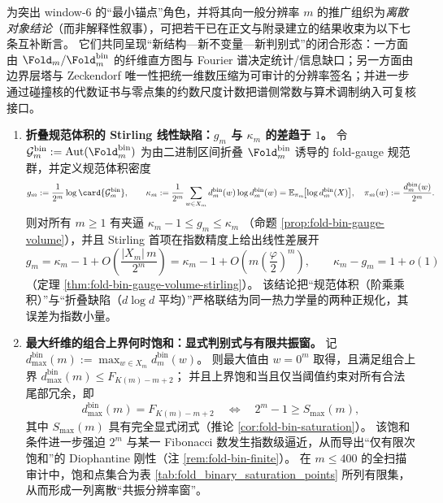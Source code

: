 为突出 window-\(6\) 的“最小锚点”角色，并将其向一般分辨率 \(m\) 的推广组织为\emph{离散对象结论}（而非解释性叙事），可把若干已在正文与附录建立的结果收束为以下七条互补断言。
它们共同呈现“新结构—新不变量—新判别式”的闭合形态：一方面由 \(\Fold_m/\Fold^{\mathrm{bin}}_m\) 的纤维直方图与 Fourier 谱决定统计/信息缺口；另一方面由边界层塔与 Zeckendorf 唯一性把统一维数压缩为可审计的分辨率签名；并进一步通过碰撞核的代数证书与零点集的约数尺度计数把谱侧常数与算术调制纳入可复核接口。

\begin{enumerate}
  \item \textbf{折叠规范体积的 Stirling 线性缺陷：\texorpdfstring{$g_m$}{gm} 与 \texorpdfstring{$\kappa_m$}{kappa} 的差趋于 \(1\)。}
  令
  \(\mathcal{G}^{\mathrm{bin}}_m:=\mathrm{Aut}(\Fold^{\mathrm{bin}}_m)\)
  为由二进制区间折叠 \(\Fold^{\mathrm{bin}}_m\) 诱导的 fold-gauge 规范群，并定义规范体积密度
  \[
  g_m:=\frac{1}{2^m}\log\card{\mathcal{G}^{\mathrm{bin}}_m},
  \qquad
  \kappa_m
  :=\frac{1}{2^m}\sum_{w\in X_m}d^{\mathrm{bin}}_m(w)\log d^{\mathrm{bin}}_m(w)
  =\mathbb{E}_{\pi_m}\!\bigl[\log d^{\mathrm{bin}}_m(X)\bigr],
  \quad
  \pi_m(w):=\frac{d^{\mathrm{bin}}_m(w)}{2^m}.
  \]
  则对所有 \(m\ge 1\) 有夹逼
  \(
  \kappa_m-1\le g_m\le \kappa_m
  \)
  （命题 \ref{prop:fold-bin-gauge-volume}），并且 Stirling 首项在指数精度上给出线性差展开
  \[
  g_m=\kappa_m-1+O\!\left(\frac{|X_m|\,m}{2^m}\right)
  =\kappa_m-1+O\!\left(m\left(\frac{\varphi}{2}\right)^m\right),
  \qquad
  \kappa_m-g_m=1+o(1)
  \]
  （定理 \ref{thm:fold-bin-gauge-volume-stirling}）。
  该结论把“规范体积（阶乘乘积）”与“折叠缺陷（\(d\log d\) 平均）”严格联结为同一热力学量的两种正规化，其误差为指数小量。

  \item \textbf{最大纤维的组合上界何时饱和：显式判别式与有限共振窗。}
  记
  \(d^{\mathrm{bin}}_{\max}(m):=\max_{w\in X_m}d^{\mathrm{bin}}_m(w)\)。
  则最大值由 \(w=0^m\) 取得，且满足组合上界
  \(d^{\mathrm{bin}}_{\max}(m)\le F_{K(m)-m+2}\)；
  并且上界饱和当且仅当阈值约束对所有合法尾部冗余，即
  \[
  d^{\mathrm{bin}}_{\max}(m)=F_{K(m)-m+2}
  \quad\Longleftrightarrow\quad
  2^m-1\ge S_{\max}(m),
  \]
  其中 \(S_{\max}(m)\) 具有完全显式闭式（推论 \ref{cor:fold-bin-saturation}）。
  该饱和条件进一步强迫 \(2^m\) 与某一 Fibonacci 数发生指数级逼近，从而导出“仅有限次饱和”的 Diophantine 刚性（注 \ref{rem:fold-bin-finite}）。
  在 \(m\le 400\) 的全扫描审计中，饱和点集合为表 \ref{tab:fold_binary_saturation_points} 所列有限集，从而形成一列离散“共振分辨率窗”。


\end{enumerate}
